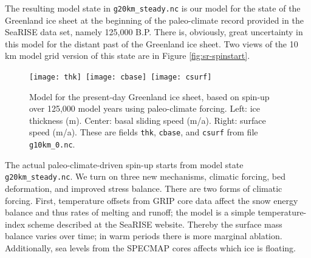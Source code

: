 The resulting model state in \texttt{g20km_steady.nc} is our model for the state of the Greenland ice sheet at the beginning of the paleo-climate record provided in the SeaRISE data set, namely 125,000 B.P.  There is, obviously, great uncertainty in this model for the distant past of the Greenland ice sheet.  Two views of the 10\,km model grid version of this state are in Figure \ref{fig:sr-spinstart}.

\begin{figure}[ht]
\centering
\mbox{\texttt{[image: thk]}
  \qquad \texttt{[image: cbase]}
  \qquad \texttt{[image: csurf]}}
\caption{Model for the present-day Greenland ice sheet, based on spin-up over 125,000 model years using paleo-climate forcing.  Left: ice thickness (m).  Center: basal sliding speed (m/a).  Right: surface speed (m/a).  These are fields \texttt{thk}, \texttt{cbase}, and \texttt{csurf} from file \texttt{g10km_0.nc}.}
\label{fig:sr-spindone-map}
\end{figure}

The actual paleo-climate-driven spin-up starts from model state \texttt{g20km_steady.nc}.  We turn on three new mechanisms, climatic forcing, bed deformation, and improved stress balance.  There are two forms of climatic forcing. First, temperature offsets from GRIP core data affect the snow energy balance and thus rates of melting and runoff; the model is a simple temperature-index scheme described at the SeaRISE website.  Thereby the surface mass balance varies over time; in warm periods there is more marginal ablation.  Additionally, sea levels from the SPECMAP cores affects which ice is floating.

